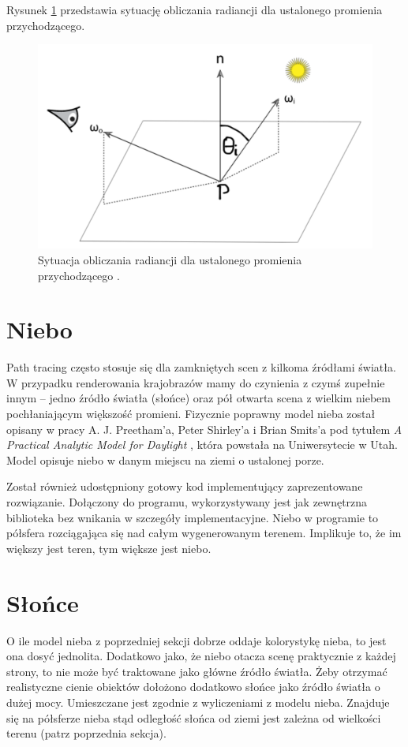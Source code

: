 \documentclass[inz,longabstract]{iithesis}
\begin{document}
        Rysunek \ref{fig:renderingEquation} przedstawia sytuację obliczania radiancji dla ustalonego promienia przychodzącego.
        
        \begin{figure}[H]
            \includegraphics[width=\linewidth]{renderingEquation.png}
            \caption{Sytuacja obliczania radiancji dla ustalonego promienia przychodzącego \cite{pbrt}.} 
            \label{fig:renderingEquation}
        \end{figure}
        
    \section{Niebo}
        Path tracing często stosuje się dla zamkniętych scen z kilkoma źródłami światła. W przypadku renderowania krajobrazów mamy do czynienia z czymś zupełnie innym -- jedno źródło światła (słońce) oraz pół otwarta scena z wielkim niebem pochłaniającym większość promieni. Fizycznie poprawny model nieba został opisany w pracy  A. J. Preetham'a, 
        Peter Shirley'a i Brian Smits'a pod tytułem \textit{A Practical Analytic Model for Daylight} \cite{sky}, która powstała na Uniwersytecie w Utah. Model opisuje niebo w danym miejscu na ziemi o ustalonej porze. 
        
        Został również udostępniony gotowy kod implementujący zaprezentowane rozwiązanie. Dołączony do programu, wykorzystywany jest jak zewnętrzna biblioteka bez wnikania w szczegóły implementacyjne. Niebo w programie to półsfera rozciągająca się nad całym wygenerowanym terenem. Implikuje to, że im większy jest teren, tym większe jest niebo.
    
    \section{Słońce}
        O ile model nieba z poprzedniej sekcji dobrze oddaje kolorystykę nieba, to jest ona dosyć jednolita. Dodatkowo jako, że niebo otacza scenę praktycznie z każdej strony, to nie może być traktowane jako główne źródło światła. Żeby otrzymać realistyczne cienie obiektów dołożono dodatkowo słońce jako źródło światła o dużej mocy. Umieszczane jest zgodnie z wyliczeniami z modelu nieba. Znajduje się na półsferze nieba stąd odległość słońca od ziemi jest zależna od wielkości terenu (patrz poprzednia sekcja).
        
\end{document}
